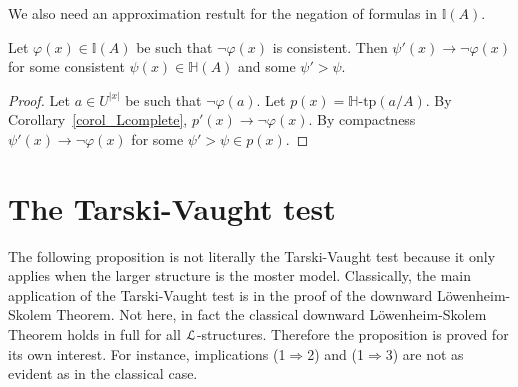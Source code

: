 \documentclass[10pt,oneside]{amsproc}
\begin{document}
We also need an approximation restult for the negation of formulas in $\mathds{I}(A)$.

\begin{proposition}\label{prop_LHapprox2}
  Let $\varphi(x)\in\mathds{I}(A)$ be such that $\neg\varphi(x)$ is consistent.
  Then  $\psi'(x)\rightarrow\neg\varphi(x)$ for some consistent $\psi(x)\in\mathds{H}(A)$ and some $\psi'>\psi$.
\end{proposition}



\begin{proof}
  Let $a\in U^{|x|}$ be such that $\neg\varphi(a)$.
  Let $p(x)=\mathds{H}\mbox{-tp}(a/A)$.
  By Corollary~\ref{corol_Lcomplete}, $p'(x)\rightarrow\neg\varphi(x)$. 
  By compactness  $\psi'(x)\rightarrow\neg\varphi(x)$ for some $\psi'>\psi\in p(x)$. 
\end{proof}


\section{The Tarski-Vaught test}

The following proposition is not literally the Tarski-Vaught test because it only applies when the larger structure is the moster model.
Classically, the main application of the Tarski-Vaught test is in the proof of the downward L\"owenheim-Skolem Theorem.
Not here, in fact the classical downward L\"owenheim-Skolem Theorem holds in full for all ${\EuScript L}$-structures.
Therefore the proposition is proved for its own interest.
For instance, implications (1$\Rightarrow$2) and (1$\Rightarrow$3) are not as evident as in the classical case.
\end{document}
